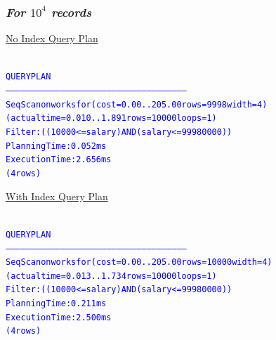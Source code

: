 \documentclass{article}
\begin{document}
    \subsubsection*{\emph{For $10^4$ records}}
    \underline{No Index Query Plan}
    \begin{center}
      {\tiny
      \begin{alltt}
      \textcolor{blue}{
        QUERY PLAN                                                 
        -----------------------------------------------------------------------------------------------------------
         Seq Scan on worksfor  (cost=0.00..205.00 rows=9998 width=4) (actual time=0.010..1.891 rows=10000 loops=1)
           Filter: ((10000 <= salary) AND (salary <= 99980000))
         Planning Time: 0.052 ms
         Execution Time: 2.656 ms
        (4 rows)
       }
      \end{alltt}
      }
    \end{center}
    \underline{With Index Query Plan}
    \begin{center}
      {\tiny
      \begin{alltt}
      \textcolor{blue}{
        QUERY PLAN                                                 
        ------------------------------------------------------------------------------------------------------------
         Seq Scan on worksfor  (cost=0.00..205.00 rows=10000 width=4) (actual time=0.013..1.734 rows=10000 loops=1)
           Filter: ((10000 <= salary) AND (salary <= 99980000))
         Planning Time: 0.211 ms
         Execution Time: 2.500 ms
        (4 rows)
       }
      \end{alltt}
      }
    \end{center}
\end{document}
